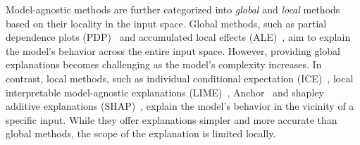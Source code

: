 \documentclass[runningheads]{llncs}
\begin{document}
Model-agnostic methods are further categorized into
\emph{global} and \emph{local} methods based on their locality in the input space.
Global methods,
such as partial dependence plots (PDP)~\cite{friedman2001greedy}
and accumulated local effects (ALE)~\cite{apley2020visualizing},
aim to explain the model's behavior across the entire input space.
However, providing global explanations becomes challenging
as the model's complexity increases.
In contrast, local methods,
such as individual conditional expectation (ICE)~\cite{goldstein2015peeking},
local interpretable model-agnostic explanations
(LIME)~\cite{ribeiro2016why}, Anchor~\cite{ribeiro2018anchors} and
shapley additive explanations (SHAP)~\cite{lundberg2017unified},
explain the model's behavior in the vicinity of a specific input.
While they offer explanations simpler and more accurate than global methods,
the scope of the explanation is limited locally.
\end{document}
